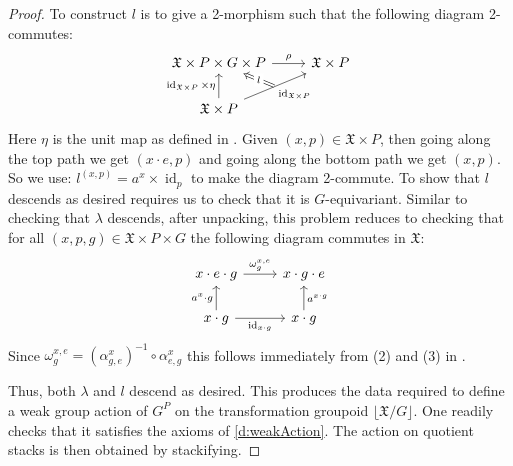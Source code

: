 \documentclass[10pt,a4paper]{amsart}
\newcommand{\fX}{{\mathfrak X}}
\DeclareMathOperator{\id}{id}
\begin{document}
\begin{proof}
    To construct $l$ is to give a 2-morphism such that the following diagram 2-commutes:
    $$
    \begin{tikzcd}
        {\fX\times P \times G \times P} & {\fX \times P} \\
        {\fX \times P}
        \arrow["\rho", from=1-1, to=1-2]
        \arrow["\id_{\fX \times P} \times \eta", from=2-1, to=1-1]
        \arrow[""{name=0, anchor=center, inner sep=0}, "{\id_{\fX\times P}}"', from=2-1, to=1-2]
        \arrow["l"{description}, Rightarrow, from=0, to=1-1]
    \end{tikzcd} 
    $$ Here $\eta$ is the unit map as defined in .
    Given $(x,p) \in \fX \times P$, then going along the top path we get $(x\cdot e,p)$ and 
    going along the bottom path we get $(x,p)$. So we use:
    $l^{(x,p)} = a^{x} \times \id_p$ to make the diagram 2-commute.
    To show that $l$ descends as desired requires us to check that it is $G$-equivariant.
    Similar to checking that $\lambda$ descends, after unpacking, this problem reduces to checking
    that for all $(x,p,g) \in \fX \times P \times G$ the following diagram commutes in $\fX$:
    $$
    \begin{tikzcd}
        {x\cdot e \cdot g} & {x\cdot g \cdot e} \\
        {x\cdot g} & {x\cdot g}
        \arrow["{\omega_{g}^{x,e}}", from=1-1, to=1-2]
        \arrow["{a^{x}\cdot g}", from=2-1, to=1-1]
        \arrow["{\id_{x\cdot g}}"', from=2-1, to=2-2]
        \arrow["{a^{x\cdot g}}"', from=2-2, to=1-2]
    \end{tikzcd}
    $$
    Since $\omega_{g}^{x,e} = (\alpha_{g,e}^{x})^{-1}\circ\alpha_{e,g}^{x}$
    this follows immediately from (2) and (3) in .

    Thus, both $\lambda$ and $l$ descend as desired. This produces the data required to 
    define a weak group action of $G^P$ on the transformation groupoid $\lfloor \fX/G\rfloor$. 
    One readily checks that it satisfies the axioms of \ref{d:weakAction}. The 
    action on quotient stacks is then obtained by stackifying.
\end{proof}
\end{document}
